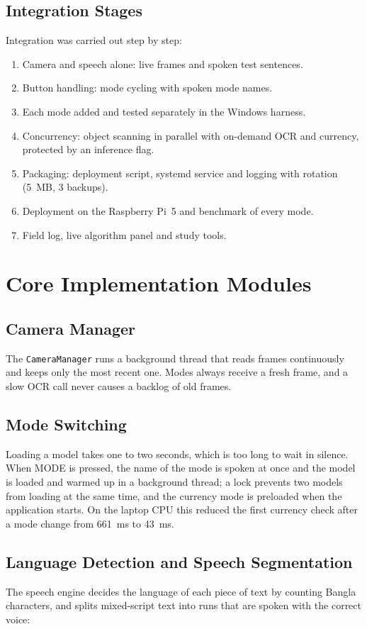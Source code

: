 \subsection*{Integration Stages}
Integration was carried out step by step:
\begin{enumerate}[noitemsep]
    \item Camera and speech alone: live frames and spoken test sentences.
    \item Button handling: mode cycling with spoken mode names.
    \item Each mode added and tested separately in the Windows harness.
    \item Concurrency: object scanning in parallel with on-demand OCR and currency, protected by an inference flag.
    \item Packaging: deployment script, systemd service and logging with rotation (5~MB, 3 backups).
    \item Deployment on the Raspberry Pi~5 and benchmark of every mode.
    \item Field log, live algorithm panel and study tools.
\end{enumerate}

\section*{Core Implementation Modules}

\subsection*{Camera Manager}
The \texttt{CameraManager} runs a background thread that reads frames continuously and keeps only the most recent one. Modes always receive a fresh frame, and a slow OCR call never causes a backlog of old frames.

\subsection*{Mode Switching}
Loading a model takes one to two seconds, which is too long to wait in silence. When MODE is pressed, the name of the mode is spoken at once and the model is loaded and warmed up in a background thread; a lock prevents two models from loading at the same time, and the currency mode is preloaded when the application starts. On the laptop CPU this reduced the first currency check after a mode change from 661~ms to 43~ms.

\subsection*{Language Detection and Speech Segmentation}
The speech engine decides the language of each piece of text by counting Bangla characters, and splits mixed-script text into runs that are spoken with the correct voice:

